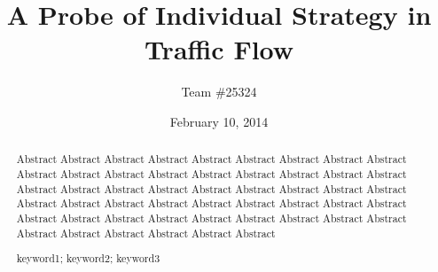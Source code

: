 \documentclass[a4paper,11pt]{article}
\title{A Probe of Individual Strategy in Traffic Flow}
\author{\small {Team \#25324}}
\date{February 10, 2014}
\begin{document}
\begin{abstract}

\thispagestyle{empty}
Abstract Abstract Abstract Abstract Abstract Abstract Abstract Abstract Abstract Abstract Abstract Abstract Abstract Abstract Abstract Abstract Abstract Abstract Abstract Abstract Abstract Abstract Abstract Abstract Abstract Abstract Abstract Abstract Abstract Abstract Abstract Abstract Abstract Abstract Abstract Abstract Abstract Abstract Abstract Abstract Abstract Abstract Abstract Abstract Abstract Abstract Abstract Abstract Abstract Abstract Abstract 
\begin{keywords}
keyword1; keyword2; keyword3
\end{keywords}
\end{abstract}

\maketitle
\pagestyle{empty}
\newpage         
\tableofcontents                                                  %
\newpage
\pagestyle{fancy}                                                 %

\end{document}
